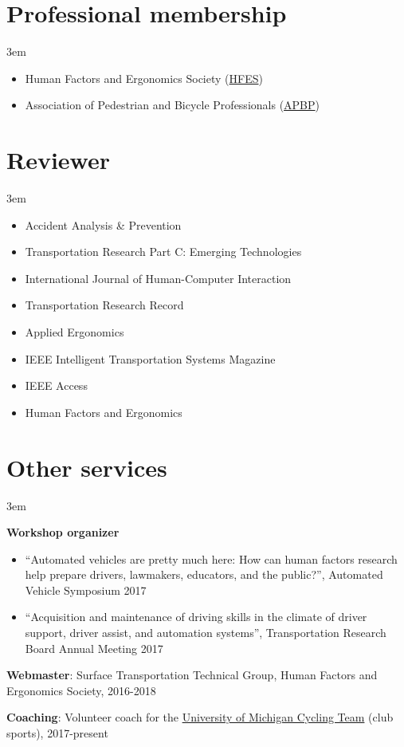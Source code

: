 \documentclass[11pt]{article}
\newenvironment{main}
{\begin{adjustwidth}{3em}{}}
{\end{adjustwidth}}
\begin{document}
\section*{Professional membership}
\begin{main}

\begin{itemize}
    \item Human Factors and Ergonomics Society (\href{https://www.hfes.org/}{HFES})
    \item Association of Pedestrian and Bicycle Professionals (\href{https://www.apbp.org/}{APBP})
\end{itemize}


\end{main}
\section*{Reviewer}
\begin{main}

\begin{itemize}
    \item Accident Analysis \& Prevention
    \item Transportation Research Part C: Emerging Technologies
    \item International Journal of Human-Computer Interaction
    \item Transportation Research Record
    \item Applied Ergonomics
    \item IEEE Intelligent Transportation Systems Magazine
    \item IEEE Access
    \item Human Factors and Ergonomics
\end{itemize}


\end{main}
\section*{Other services}
\begin{main}

\textbf{Workshop organizer}
\begin{itemize}
    \item “Automated vehicles are pretty much here: How can human factors research help prepare drivers, lawmakers, educators, and the public?”, Automated Vehicle Symposium 2017
    \item “Acquisition and maintenance of driving skills in the climate of driver support, driver assist, and automation systems”, Transportation Research Board Annual Meeting 2017
\end{itemize}

\textbf{Webmaster}: Surface Transportation Technical Group, Human Factors and Ergonomics Society, 2016-2018

\textbf{Coaching}: Volunteer coach for the \href{https://www.umcycling.org/}{University of Michigan Cycling Team} (club sports), 2017-present

\end{main}
\end{document}
